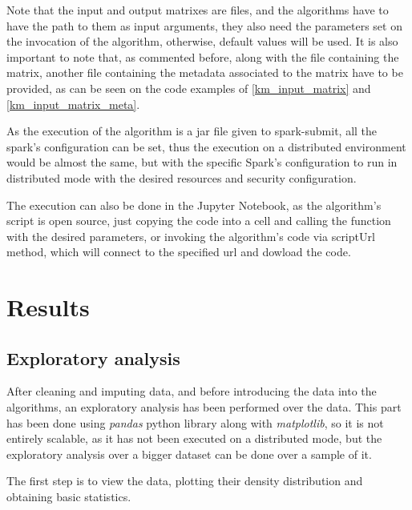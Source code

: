 \documentclass[11pt]{book} %
\begin{document}
    Note that the input and output matrixes are files, and the algorithms have to have the path to them as input arguments, they also need the parameters set on the invocation of the algorithm, otherwise, default values will be used. It is also important to note that, as commented before, along with the file containing the matrix, another file containing the metadata associated to the matrix have to be provided, as can be seen on the code examples of \ref{km_input_matrix} and \ref{km_input_matrix_meta}.

    As the execution of the algorithm is a jar file given to spark-submit, all the spark's configuration can be set, thus the execution on a distributed environment would be almost the same, but with the specific Spark's configuration to run in distributed mode with the desired resources and security configuration.

    The execution can also be done in the Jupyter Notebook, as the algorithm's script is open source, just copying the code into a cell and calling the function with the desired parameters, or invoking the algorithm's code via scriptUrl method, which will connect to the specified url and dowload the code.

  \newpage

  \section{Results}

    \subsection{Exploratory analysis}

      After cleaning and imputing data, and before introducing the data into the algorithms, an exploratory analysis has been performed over the data. This part has been done using \emph{pandas} python library along with \emph{matplotlib}, so it is not entirely scalable, as it has not been executed on a distributed mode, but the exploratory analysis over a bigger dataset can be done over a sample of it.

      The first step is to view the data, plotting their density distribution and obtaining basic statistics.
\end{document}
